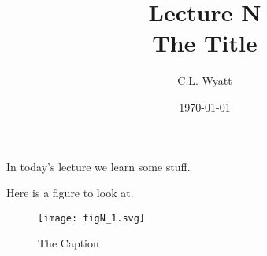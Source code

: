 \documentclass{article}
\begin{document}
\title{Lecture N\\ The Title}
\author{C.L. Wyatt}
\date{\today}
\maketitle

In today's lecture we learn some stuff.

Here is a figure to look at.

\begin{figure}
  \centering
  \texttt{[image: figN\_1.svg]}
  \caption{The Caption}
\end{figure}
\end{document}
